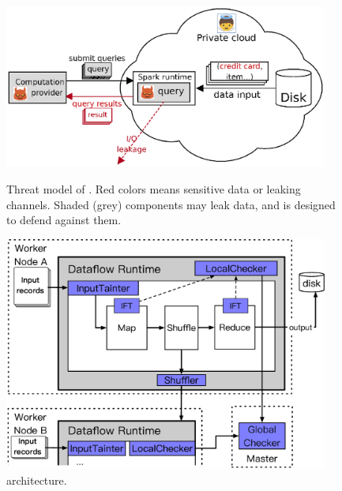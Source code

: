 \begin{figure}[h]
    \centering
    \begin{minipage}{.48\textwidth}    
        \includegraphics[width=0.95\textwidth]{figures/threat_private.ps}
        \caption{Threat model of \kakute. Red colors means sensitive data or 
leaking channels. Shaded (grey) components may leak data, and \kakute is 
designed to defend against them.}
        \label{fig:falcon-arch}
    \end{minipage}
    \centering
    \begin{minipage}{0.48\textwidth}
         \vspace{-.7in}
        \includegraphics[width=0.95\textwidth]{figures/kakute_arch.ps}
         \vspace{-.4in}
        \caption{\kakute architecture.}
        \label{fig:falcon-protocol}
    \end{minipage}
\end{figure}


